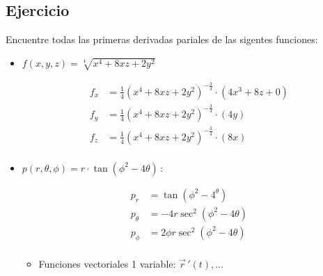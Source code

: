 \subsection{Ejercicio}
Encuentre todas las primeras derivadas pariales de las sigentes funciones:
\begin{itemize}
    \item $f(x,y,z)=\sqrt[4]{x^4+8xz+2y^2}$
        \begin{center}
           \begin{align*}
               f_x &= \frac{1}{4} (x^4+8xz+2y^2)^{-\frac{3}{4} }\cdot(4x^3+8z+0) \\ 
               f_y &= \frac{1}{4} (x^4+8xz+2y^2)^{-\frac{3}{4} }\cdot(4y) \\ 
               f_z &= \frac{1}{4} (x^4+8xz+2y^2)^{-\frac{3}{4} }\cdot(8x) \\ 
           \end{align*}
        \end{center}
    
    \item $p(r,\theta,\phi)=r\cdot \tan (\phi^2-4\theta)\,$: 
        \begin{center}
           \begin{align*}
               p_r &= \tan (\phi^2-4^\theta) \\ 
               p_{\theta} &= -4r \sec ^2 (\phi^2-4\theta) \\ 
               p_{\phi} &= 2\phi r \sec ^2(\phi^2-4\theta) \\ 
           \end{align*}
           \begin{itemize}[label=\#]
               \item Funciones vectoriales 1 variable: $\vec{r}\,' (t), \dots $
           \end{itemize}
        \end{center}
\end{itemize}


